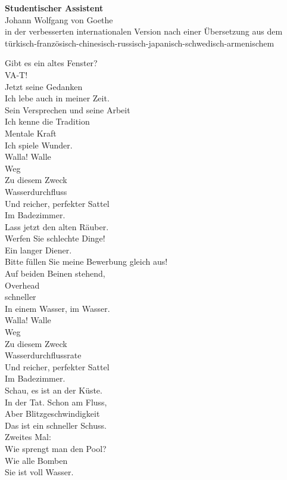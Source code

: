 {

{\large \textbf{Studentischer Assistent} \\
    Johann Wolfgang von Goethe} \\
{\small in der verbesserten internationalen Version nach einer Übersetzung aus dem türkisch-französisch-chinesisch-russisch-japanisch-schwedisch-armenischem \\}

Gibt es ein altes Fenster? \\
VA-T! \\
Jetzt seine Gedanken \\
Ich lebe auch in meiner Zeit. \\
Sein Versprechen und seine Arbeit \\
Ich kenne die Tradition \\
Mentale Kraft \\
Ich spiele Wunder. \\

Walla! Walle \\
Weg \\
Zu diesem Zweck \\
Wasserdurchfluss \\
Und reicher, perfekter Sattel \\
Im Badezimmer. \\

Lass jetzt den alten Räuber. \\
Werfen Sie schlechte Dinge! \\
Ein langer Diener. \\
Bitte füllen Sie meine Bewerbung gleich aus! \\
Auf beiden Beinen stehend, \\
Overhead \\
schneller \\
In einem Wasser, im Wasser. \\

Walla! Walle \\
Weg \\
Zu diesem Zweck \\
Wasserdurchflussrate \\
Und reicher, perfekter Sattel \\
Im Badezimmer. \\

Schau, es ist an der Küste. \\
In der Tat. Schon am Fluss, \\
Aber Blitzgeschwindigkeit \\
Das ist ein schneller Schuss. \\
Zweites Mal: \\
Wie sprengt man den Pool? \\
Wie alle Bomben \\
Sie ist voll Wasser. \\

}
